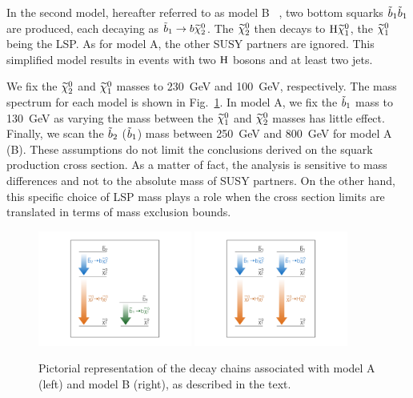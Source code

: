 In the second model, hereafter referred to as model B ~\cite{annthesis}, two bottom
squarks $\tilde{b}_1\tilde{b}_1$ are produced, each decaying as
$\tilde{b}_1 \to b \widetilde{\chi}^{0}_2$. The $\widetilde{\chi}^{0}_2$ then decays to $\mathrm{H}
\widetilde{\chi}^{0}_1$, the $\widetilde{\chi}^{0}_1$ being the LSP. As for model A, the other SUSY
partners are ignored. This simplified model results
in events with two $\mathrm{H}$ bosons and at least two jets.

We fix the $\widetilde{\chi}^{0}_2$ and $\widetilde{\chi}^{0}_1$ masses to 230~GeV
and 100~GeV, respectively. 
The mass spectrum for each model is shown in
Fig.~\ref{fig:simplifiedModels}.
In model A, %
we fix the $\tilde{b}_1$ mass to 130~GeV as varying the mass
between the $\widetilde{\chi}^{0}_1$ and $\widetilde{\chi}^{0}_2$ masses has little effect.
Finally, we scan the $\tilde{b}_2$ ($\tilde{b}_1$) mass between 250~GeV
and 800~GeV for model A (B). These assumptions do not limit the
conclusions derived on the squark production cross section. As a
matter of fact, the analysis is sensitive to mass differences and not
to the absolute mass of SUSY partners. On the other hand, this specific
choice of LSP mass plays a role when the cross section limits are
translated in terms of mass exclusion bounds.

\begin{figure}[htb]\centering
\includegraphics[width=0.45\textwidth,viewport=250 100 800 700,clip=true]{figs/pheno/model1}
\includegraphics[width=0.45\textwidth,viewport=250 100 800 700,clip=true]{figs/pheno/model2}
\caption{\label{fig:simplifiedModels} Pictorial representation of the
  decay chains associated with model A (left) and model B (right), as described in the text.}
\end{figure}

